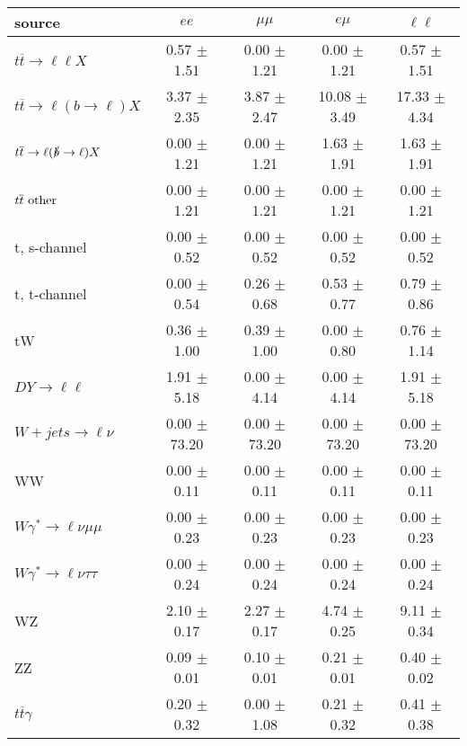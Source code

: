 \begin{tabular}{l|cccc} \hline\hline
source & $ee$ & $\mu\mu$ & $e\mu$ & $\ell\ell $ \\
\hline
$t\overline{t} \rightarrow \ell \ell X$ &  0.57 $\pm$  1.51 &  0.00 $\pm$  1.21 &  0.00 $\pm$  1.21 &  0.57 $\pm$  1.51 \\
$t\overline{t} \rightarrow \ell (b \rightarrow \ell) X$ &  3.37 $\pm$  2.35 &  3.87 $\pm$  2.47 & 10.08 $\pm$  3.49 & 17.33 $\pm$  4.34 \\
$t\overline{t} \rightarrow \ell (\slashed b \rightarrow \ell) X$ &  0.00 $\pm$  1.21 &  0.00 $\pm$  1.21 &  1.63 $\pm$  1.91 &  1.63 $\pm$  1.91 \\
        $t\overline{t}\ \rm{other}$ &  0.00 $\pm$  1.21 &  0.00 $\pm$  1.21 &  0.00 $\pm$  1.21 &  0.00 $\pm$  1.21 \\
\hline
                       t, s-channel &  0.00 $\pm$  0.52 &  0.00 $\pm$  0.52 &  0.00 $\pm$  0.52 &  0.00 $\pm$  0.52 \\
                       t, t-channel &  0.00 $\pm$  0.54 &  0.26 $\pm$  0.68 &  0.53 $\pm$  0.77 &  0.79 $\pm$  0.86 \\
                                 tW &  0.36 $\pm$  1.00 &  0.39 $\pm$  1.00 &  0.00 $\pm$  0.80 &  0.76 $\pm$  1.14 \\
\hline
         $DY \rightarrow \ell \ell$ &  1.91 $\pm$  5.18 &  0.00 $\pm$  4.14 &  0.00 $\pm$  4.14 &  1.91 $\pm$  5.18 \\
      $W+jets \rightarrow \ell \nu$ &  0.00 $\pm$ 73.20 &  0.00 $\pm$ 73.20 &  0.00 $\pm$ 73.20 &  0.00 $\pm$ 73.20 \\
                                 WW &  0.00 $\pm$  0.11 &  0.00 $\pm$  0.11 &  0.00 $\pm$  0.11 &  0.00 $\pm$  0.11 \\
\hline
$W\gamma^{*} \rightarrow \ell \nu \mu\mu$ &  0.00 $\pm$  0.23 &  0.00 $\pm$  0.23 &  0.00 $\pm$  0.23 &  0.00 $\pm$  0.23 \\
$W\gamma^{*} \rightarrow \ell \nu \tau\tau$ &  0.00 $\pm$  0.24 &  0.00 $\pm$  0.24 &  0.00 $\pm$  0.24 &  0.00 $\pm$  0.24 \\
                                 WZ &  2.10 $\pm$  0.17 &  2.27 $\pm$  0.17 &  4.74 $\pm$  0.25 &  9.11 $\pm$  0.34 \\
                                 ZZ &  0.09 $\pm$  0.01 &  0.10 $\pm$  0.01 &  0.21 $\pm$  0.01 &  0.40 $\pm$  0.02 \\
\hline
              $t\overline{t}\gamma$ &  0.20 $\pm$  0.32 &  0.00 $\pm$  1.08 &  0.21 $\pm$  0.32 &  0.41 $\pm$  0.38 \\

\end{tabular}
